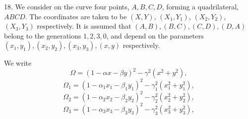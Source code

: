 \documentclass[11pt,a4paper]{article}
\begin{document}
\medskip

18. We consider on the curve four points, $A, B, C, D$, forming a quadrilateral, $ABCD$. The coordinates are taken to be $(X, Y)$, $(X_{1}, Y_{1})$, $(X_{2}, Y_{2})$, $(X_{3}, Y_{3})$ respectively. It is assumed that $(A, B), (B, C), (C, D), (D, A)$ belong to the generations $1, 2, 3, 0$, and depend on the parameters $(x_{1}, y_{1}), (x_{2}, y_{2}), (x_{3}, y_{3}), (x, y)$ respectively.

We write
\[
\Omega = (1 - \alpha x - \beta y)^{2} - \gamma^{2}(x^{2} + y^{2}),
\]
\[
\Omega_{1} = (1 - \alpha_{1}x_{1} - \beta_{1}y_{1})^{2} - \gamma_{1}^{2}(x_{1}^{2} + y_{1}^{2}),
\]
\[
\Omega_{2} = (1 - \alpha_{2}x_{2} - \beta_{2}y_{2})^{2} - \gamma_{2}^{2}(x_{2}^{2} + y_{2}^{2}),
\]
\[
\Omega_{3} = (1 - \alpha_{3}x_{3} - \beta_{3}y_{3})^{2} - \gamma_{3}^{2}(x_{3}^{2} + y_{3}^{2}),
\]

\newpage

\end{document}
